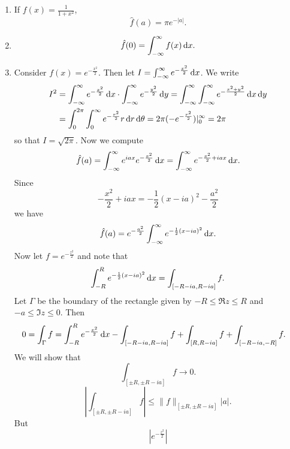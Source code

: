 \begin{xmpl}
  \begin{enumerate}
    \item{
      If $f(x) = \frac{1}{1 + x^2}$,
      $$
      \hat{f}(a) = \pi e^{-|a|}.
      $$
    }
    \item{
      $$\hat{f}(0) = \int_{-\infty}^\infty f(x) \mathop{}\!\mathrm{d} x.$$
    }
    \item{
      Consider $f(x) = e^{-\frac{x^2}{2}}$. Then
      let $I = \int_{-\infty}^\infty e^{-\frac{x^2}{2}} \mathop{}\!\mathrm{d} x$.
      We write
      \begin{align*}
         I^2
      &= \int_{-\infty}^\infty
           e^{-\frac{x^2}{2}}
           \mathop{}\!\mathrm{d} x
         \cdot
         \int_{-\infty}^\infty
           e^{-\frac{y^2}{2}}
           \mathop{}\!\mathrm{d} y
       = \int_{-\infty}^\infty
         \int_{-\infty}^\infty
           e^{-\frac{x^2 + y^2}{2}}
           \mathop{}\!\mathrm{d} x \mathop{}\!\mathrm{d} y \\
      &= \int_0^{2\pi}
         \int_0^\infty
           e^{-\frac{r^2}{2}} r \mathop{}\!\mathrm{d} r \mathop{}\!\mathrm{d} \theta
       = 2 \pi (-e^{-\frac{r^2}{2}})|_0^\infty
       = 2 \pi
      \end{align*}
      so that $I = \sqrt{2 \pi}$. Now we compute
      $$
        \hat{f}(a)
      = \int_{-\infty}^\infty
          e^{i a x}
          e^{-\frac{x^2}{2}}
          \mathop{}\!\mathrm{d} x
      = \int_{-\infty}^\infty
          e^{-\frac{x^2}{2} + i a x} \mathop{}\!\mathrm{d} x.
      $$
      Since
      $$
        -\frac{x^2}{2} + i a x
      = -\frac{1}{2}(x - i a)^2 - \frac{a^2}{2}
      $$
      we have
      $$
        \hat{f}(a)
      = e^{-\frac{a^2}{2}}
        \int_{-\infty}^\infty
          e^{-\frac{1}{2}(x - ia)^2}
          \mathop{}\!\mathrm{d} x.
      $$
      Now let $f = e^{-\frac{z^2}{2}}$ and note that
      $$
        \int_{-R}^R
          e^{-\frac{1}{2}(x - ia)^2}
          \mathop{}\!\mathrm{d} x
      = \int_{[-R - i a, R - i a]} f.
      $$
      Let $\Gamma$ be the boundary of the rectangle given by
      $-R \leq \Re z \leq R$ and $-a \leq \Im z \leq 0$.
      Then
      \begin{align*}
         0
      &= \int_\Gamma f
       =  \int_{-R}^R e^{-\frac{x^2}{2}} \mathop{}\!\mathrm{d} x
        - \int_{[-R-ia, R - ia]} f
        + \int_{[R, R - i a]} f
        + \int_{[-R-ia, -R]} f.
      \end{align*}
      We will show that
      $$
      \int_{[\pm R, \pm R - i a]} f \to 0.
      $$
      $$
           \left|
             \int_{[\pm R, \pm R - i a]} f
           \right|
      \leq \| f \|_{[\pm R, \pm R - ia]} |a|.
      $$
      But
      $$
           |e^{-\frac{z^2}{2}}|
$$}
\end{enumerate}
\end{xmpl}
